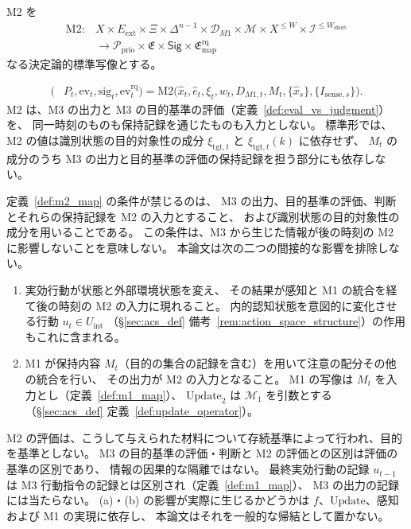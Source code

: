 \begin{definition}
\label{def:m2_map}
M2 を
\[
\begin{aligned}
\mathrm{M2}:&
X\times E_{\mathrm{ext}}\times\Xi
\times\Delta^{n-1}\times\mathcal D_{M1}
\times\mathcal M\times X^{\le W}
\times\mathcal I^{\le W_{\mathrm{short}}}
\\
&\to
\mathcal P_{\mathrm{prio}}
\times\mathfrak E
\times\mathsf{Sig}
\times\mathfrak E^{\mathrm{rq}}_{\mathrm{map}}
\end{aligned}
\]
なる決定論的標準写像とする。

\[
\begin{aligned}
(&P_t,\mathrm{ev}_t,\mathrm{sig}_t,\mathrm{ev}^{\mathrm{rq}}_t)
=
\mathrm{M2}\bigl(
\hat x_t,\hat e_t,\xi_t,w_t,D_{M1,t},M_t,
\{\hat x_s\},\{I_{\mathrm{sense},s}\}
\bigr).
\end{aligned}
\]
M2 は、M3 の出力と M3 の目的基準の評価（定義~\ref{def:eval_vs_judgment}）を、
同一時刻のものも保持記録を通じたものも入力としない。
標準形では、M2 の値は識別状態の目的対象性の成分
$\xi_{\mathrm{tgt},t}$ と $\xi_{\mathrm{tgt},t}(k)$ に依存せず、
$M_t$ の成分のうち M3 の出力と目的基準の評価の保持記録を担う部分にも依存しない。
\end{definition}

\begin{remark}[M2 に戻らないことの範囲]
\label{rem:m2_no_return_scope}
定義~\ref{def:m2_map} の条件が禁じるのは、
M3 の出力、目的基準の評価、判断とそれらの保持記録を M2 の入力とすること、
および識別状態の目的対象性の成分を用いることである。
この条件は、M3 から生じた情報が後の時刻の M2 に影響しないことを意味しない。
本論文は次の二つの間接的な影響を排除しない。
\begin{enumerate}[label=(\alph*)]
  \item 実効行動が状態と外部環境状態を変え、
  その結果が感知と M1 の統合を経て後の時刻の M2 の入力に現れること。
  内的認知状態を意図的に変化させる行動 $u_t\in U_{\mathrm{int}}$
  （\S\ref{sec:acs_def} 備考~\ref{rem:action_space_structure}）の作用もこれに含まれる。
  \item M1 が保持内容 $M_t$（目的の集合の記録を含む）を用いて注意の配分その他の統合を行い、
  その出力が M2 の入力となること。
  M1 の写像は $M_t$ を入力とし（定義~\ref{def:m1_map}）、
  $\mathrm{Update}_2$ は $\mathcal M_1$ を引数とする
  （\S\ref{sec:acs_def} 定義~\ref{def:update_operator}）。
\end{enumerate}
M2 の評価は、こうして与えられた材料について存続基準によって行われ、目的を基準としない。
M3 の目的基準の評価・判断と M2 の評価との区別は評価の基準の区別であり、
情報の因果的な隔離ではない。
最終実効行動の記録 $u_{t-1}$ は M3 行動指令の記録とは区別され（定義~\ref{def:m1_map}）、
M3 の出力の記録には当たらない。
(a)・(b) の影響が実際に生じるかどうかは $f$、$\mathrm{Update}$、感知および M1 の実現に依存し、
本論文はそれを一般的な帰結として置かない。
\end{remark}

